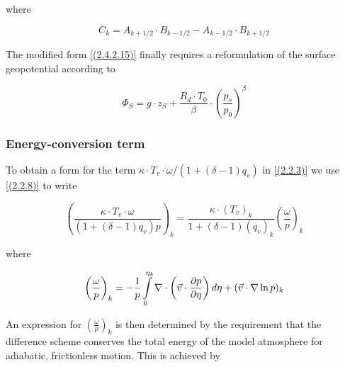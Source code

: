 where

\begin{equation}
C_k = A_{k+1/2} \cdot B_{k-1/2} - A_{k-1/2} \cdot B_{k+1/2}
\label{(2.4.2.16)}
\end{equation}

The modified form \ref{(2.4.2.15)} finally requires a reformulation of
the surface geopotential according to

\begin{equation}
\Phi_S = g \cdot z_S + \frac{R_d \cdot T_0}{\beta}
\cdot \left(\frac{p_s}{p_0}\right)^{\beta}
\label{(2.4.2.17)}
\end{equation}

\subsubsection{Energy-conversion term}

To obtain a form for the term $\kappa \cdot T_v
\cdot\omega / (1 + (\delta - 1)q_v)$ in \ref{(2.2.3)} we use
\ref{(2.2.8)} to write

\begin{equation}
\left(\frac{\kappa \cdot T_v \cdot\omega}{(1 + (\delta - 1)q_v)p}\right)_k 
= \frac{\kappa \cdot (T_v)_k}{1 + (\delta - 1)(q_v)_k}
\left(\frac{\omega}{p}\right)_k
\label{(2.4.2.18)}
\end{equation}

where

\begin{equation}
\left(\frac{\omega}{p}\right)_k = -\frac{1}{p}
\int\limits^{\eta_k}_{0}\nabla\cdot\left(\vec{v}\cdot\frac {\partial p} {\partial \eta}\right)d\eta
+(\vec{v}\cdot\nabla\ln p)_k 
\label{(2.4.2.19)}
\end{equation}

An expression for $\left(\frac{\omega}{p}\right)_k$ is then determined 
by the requirement that the difference scheme conserves the total energy 
of the model atmosphere for adiabatic, frictionless motion. This is 
achieved by

